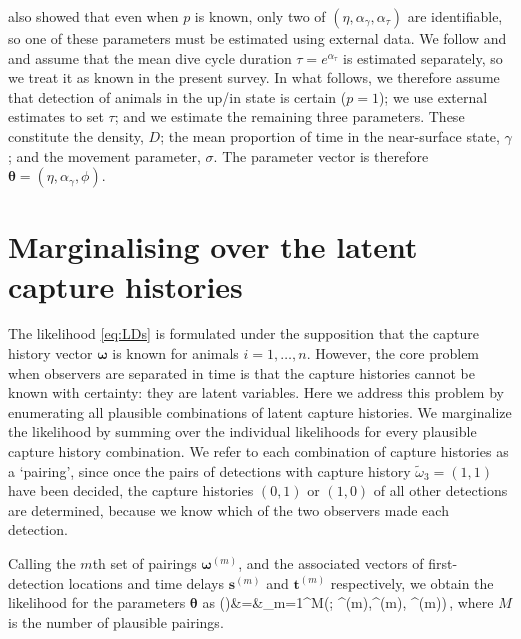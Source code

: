 \documentclass[useAMS, usenatbib, referee]{biom}\usepackage[]{graphicx}\usepackage[]{color}
\newcommand{\dotomega}{\tilde{\omega}}
\begin{document}
\cite{Stevenson+al:19} also showed that even when $p$ is known, only two of $(\eta,\alpha_\gamma,\alpha_\tau)$ are identifiable, so one of these parameters must be estimated using external data. We follow \cite{Stevenson+al:19} and \cite{Hiby+Lovell:98} and assume that the mean dive cycle duration $\tau=e^{\alpha_\tau}$ is estimated separately, so we treat it as known in the present survey. In what follows, we therefore assume that detection of animals in the up/in state is certain ($p=1$); we use external estimates to set $\tau$; and we estimate the remaining three parameters. These constitute the density, $D$; the mean proportion of time in the near-surface state, $\gamma$; and the movement parameter, $\sigma$. The parameter vector is therefore $\bm{\theta}=(\eta,\alpha_\gamma, \phi)$.



\section{Marginalising over the latent capture histories}

The likelihood \eqref{eq:LDs} %
is formulated under the supposition that the capture history vector $\bm{\omega}$ is known for animals $i=1, \ldots, n$. However, the core problem when observers are separated in time is that the capture histories cannot be known with certainty: they are latent variables. Here we address this problem by enumerating all plausible combinations of latent capture histories. We marginalize the likelihood by summing over the individual likelihoods for every plausible capture history combination. We refer to each combination of capture histories as a `pairing', since once the pairs of detections with capture history $\dotomega_3=(1,1)$ have been decided, the capture histories $(0, 1)$ or $(1, 0)$ of all other detections are determined, because we know which of the two observers made each detection.

Calling the $m$th set of pairings $\bm{\omega}^{(m)}$, and the associated vectors of first-detection locations and time delays  $\bm{s}^{(m)}$ and $\bm{t}^{(m)}$ respectively, we obtain the likelihood for the parameters $\bm{\theta}$ as
\be
{}(\bm{\theta})&=&\sum_{m=1}^M\left(\bm{\theta}; ^{(m)},\bm{\omega}^{(m)}, ^{(m)}\right)\,,
\ee
\noindent
where $M$ is the number of plausible pairings.
\end{document}
